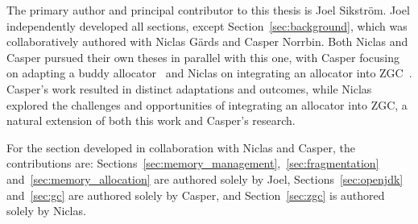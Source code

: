 
The primary author and principal contributor to this thesis is Joel Sikström. Joel independently developed all sections, except Section~\ref{sec:background}, which was collaboratively authored with Niclas Gärds and Casper Norrbin. Both Niclas and Casper pursued their own theses in parallel with this one, with Casper focusing on adapting a buddy allocator~\cite{casper} and Niclas on integrating an allocator into ZGC~\cite{niclas}. Casper's work resulted in distinct adaptations and outcomes, while Niclas explored the challenges and opportunities of integrating an allocator into ZGC, a natural extension of both this work and Casper's research.

For the section developed in collaboration with Niclas and Casper, the contributions are: Sections~\ref{sec:memory_management},~\ref{sec:fragmentation} and~\ref{sec:memory_allocation} are authored solely by Joel, Sections~\ref{sec:openjdk} and~\ref{sec:gc} are authored solely by Casper, and Section~\ref{sec:zgc} is authored solely by Niclas.

